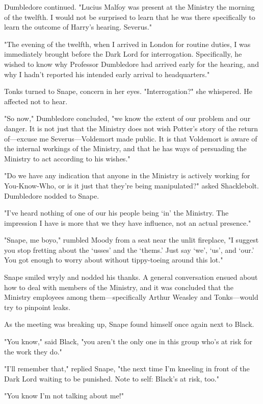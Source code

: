 Dumbledore continued. "Lucius Malfoy was present at the Ministry the morning of the twelfth. I would not be surprised to learn that he was there specifically to learn the outcome of Harry's hearing. Severus."

"The evening of the twelfth, when I arrived in{\el} London for routine duties, I was immediately brought before the Dark Lord for interrogation. Specifically, he wished to know why Professor Dumbledore had arrived early for the hearing, and why I hadn't reported his intended early arrival to headquarters."

Tonks turned to Snape, concern in her eyes. "Interrogation?" she whispered. He affected not to hear.

"So now," Dumbledore concluded, "we know the extent of our problem and our danger. It is not just that the Ministry does not wish Potter's story of the return of—excuse me Severus—Voldemort made public. It is that Voldemort is aware of the internal workings of the Ministry, and that he has ways of persuading the Ministry to act according to his wishes."

"Do we have any indication that anyone in the Ministry is actively working for You-Know-Who, or is it just that they're being manipulated?" asked Shacklebolt. Dumbledore nodded to Snape.

"I've heard nothing of one of our{\el} his people being `in' the Ministry. The impression I have is more that we{\el} they have influence, not an actual presence."

"Snape, me boyo," rumbled Moody from a seat near the unlit fireplace, "I suggest you stop fretting about the `usses' and the `thems.' Just say `we', `us', and `our.' You got enough to worry about without tippy-toeing around this lot."

Snape smiled wryly and nodded his thanks. A general conversation ensued about how to deal with members of the Ministry, and it was concluded that the Ministry employees among them—specifically Arthur Weasley and Tonks—would try to pinpoint leaks.

As the meeting was breaking up, Snape found himself once again next to Black.

"You know," said Black, "you aren't the only one in this group who's at risk for the work they do."

"I'll remember that," replied Snape, "the next time I'm kneeling in front of the Dark Lord waiting to be punished. Note to self: Black's at risk, too."

"You know I'm not talking about me!"

